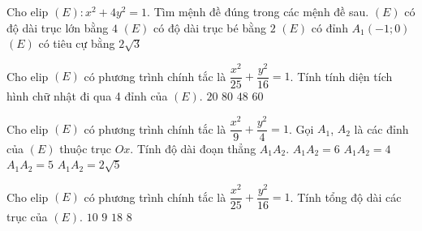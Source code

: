 \begin{ex}%
	Cho elip $(E)\colon x^2+4 y^2=1$. Tìm mệnh đề 
	đúng trong các  mệnh đề sau.
	\choice 
		{$(E)$ có độ dài trục lớn bằng $ 4 $} 
		{$ (E) $ có độ dài trục bé bằng $ 2 $} 
		{\True $(E)$ có đỉnh  $A_1(-1; 0)$}
		{$(E)$  có tiêu cự bằng $2\sqrt{3}$}
\end{ex}

\begin{ex}%
	Cho elip $(E)$ có phương trình chính tắc là $\dfrac{x^2}{25}+\dfrac{y^2}{16}=1$. Tính tính diện tích hình chữ nhật đi  qua 4 đỉnh của $(E)$.
	 \choice
		{  $20$}
		{\True $80$} 
		 {$48$}
		{$60$} 
\end{ex}

\begin{ex}%
	Cho  elip $\left(E\right)$ có phương trình chính tắc là $\dfrac{x^2}{9}+\dfrac{y^2}{4}=1$. Gọi $A_1$, $A_2$ là các đỉnh của $(E)$ thuộc trục $Ox$. Tính độ dài đoạn thẳng $A_1A_2$.
	\choice 
		{\True  $A_1A_2=6$}
		{$A_1A_2=4$} 
		 {$A_1A_2=5$}
		 {$A_1A_2=2\sqrt{5}$}
\end{ex}

\begin{ex}%
	Cho elip $\left(E\right)$ có phương trình chính tắc là $\dfrac{x^2}{25}+\dfrac{y^2}{16}=1$. Tính tổng độ dài các trục của $(E)$. 
	 \choice
		{\True $10$} 
		{$9$} 
		 {\True $18$}
		{$8$} 
\end{ex}

